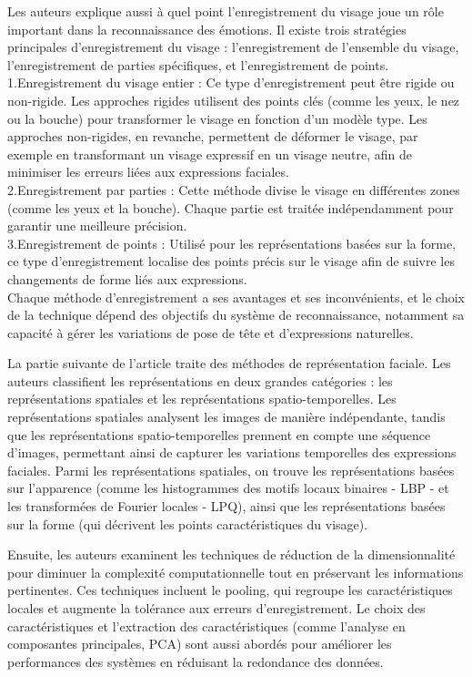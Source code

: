 \documentclass{rapport}
\begin{document}
Les auteurs explique aussi à quel point l'enregistrement du visage joue un rôle
important dans la reconnaissance des émotions. Il existe trois stratégies
principales d'enregistrement du visage : l'enregistrement de l’ensemble du visage,
l’enregistrement de parties spécifiques, et l’enregistrement de points.
\\1.Enregistrement du visage entier : Ce type d’enregistrement peut être rigide ou
non-rigide. Les approches rigides utilisent des points clés (comme les yeux,
le nez ou la bouche) pour transformer le visage en fonction d’un modèle type.
Les approches non-rigides, en revanche, permettent de déformer le visage, par
exemple en transformant un visage expressif en un visage neutre, afin de minimiser
les erreurs liées aux expressions faciales.
\\2.Enregistrement par parties : Cette méthode divise le visage
en différentes zones (comme les yeux et la bouche). Chaque partie
est traitée indépendamment pour garantir une meilleure précision.
\\3.Enregistrement de points : Utilisé pour les représentations
basées sur la forme, ce type d'enregistrement localise des points
précis sur le visage afin de suivre les changements de forme liés
aux expressions.
\\Chaque méthode d'enregistrement a ses avantages et ses inconvénients, et le choix
de la technique dépend des objectifs du système de reconnaissance, notamment sa
capacité à gérer les variations de pose de tête et d'expressions naturelles.

La partie suivante de l'article traite des méthodes de représentation faciale.
Les auteurs classifient les représentations en deux grandes catégories : les
représentations spatiales et les représentations spatio-temporelles. Les
représentations spatiales analysent les images de manière indépendante, tandis que
les représentations spatio-temporelles prennent en compte une séquence d'images,
permettant ainsi de capturer les variations temporelles des expressions faciales.
Parmi les représentations spatiales, on trouve les représentations basées sur
l'apparence (comme les histogrammes des motifs locaux binaires - LBP - et les
transformées de Fourier locales - LPQ), ainsi que les représentations basées sur la
forme (qui décrivent les points caractéristiques du visage).

Ensuite, les auteurs examinent les techniques de réduction de la dimensionnalité
pour diminuer la complexité computationnelle tout en préservant les informations
pertinentes. Ces techniques incluent le pooling, qui regroupe les caractéristiques
locales et augmente la tolérance aux erreurs d'enregistrement. Le choix des
caractéristiques et l'extraction des caractéristiques (comme l'analyse en
composantes principales, PCA) sont aussi abordés pour améliorer les performances
des systèmes en réduisant la redondance des données.
\end{document}
